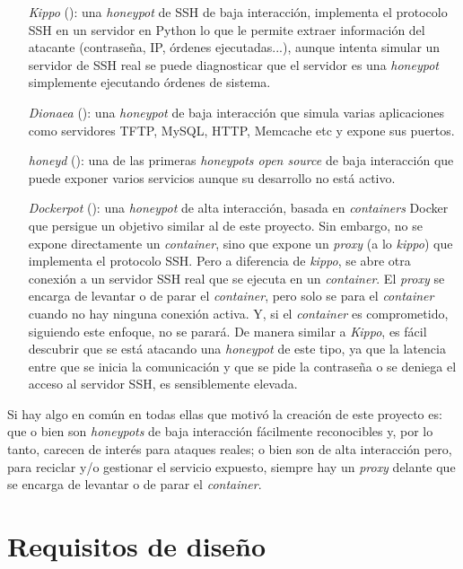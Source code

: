 \begin{enumerate}
    \item[\emph{Kippo}] (\cite{honeynet-kippo}): una \emph{honeypot} de SSH de baja interacción, implementa el protocolo SSH en un servidor en Python
    lo que le permite extraer información del atacante (contraseña, IP, órdenes ejecutadas...), aunque intenta simular un servidor de SSH real
    se puede diagnosticar que el servidor es una \emph{honeypot} simplemente ejecutando órdenes de sistema.
    \item[\emph{Dionaea}] (\cite{honeynet-dionaea}): una \emph{honeypot} de baja interacción que simula varias aplicaciones como servidores TFTP, MySQL, HTTP, Memcache etc y expone sus puertos.
    \item[\emph{honeyd}] (\cite{honeynet-lowinteraction}): una de las primeras \emph{honeypots open source} de baja interacción que puede exponer varios servicios aunque su desarrollo no está activo.
    \item[\emph{Dockerpot}] (\cite{honeynet-dockpot}): una \emph{honeypot} de alta interacción, basada en \emph{containers} Docker que persigue un objetivo similar al de este proyecto.
    Sin embargo, no se expone directamente un \emph{container}, sino que expone un \emph{proxy} (a lo \emph{kippo}) que implementa el protocolo SSH. Pero a diferencia de \emph{kippo}, se abre otra conexión
    a un servidor SSH real que se ejecuta en un \emph{container}. El \emph{proxy} se encarga de levantar o de parar el \emph{container}, pero solo se para el \emph{container} cuando no hay ninguna conexión activa. Y, si el \emph{container} es comprometido, siguiendo este enfoque, no se parará.
    De manera similar a \emph{Kippo}, es fácil descubrir  que se está atacando una \emph{honeypot} de este tipo, ya que la latencia entre que se inicia la comunicación
    y que se pide la contraseña o se deniega el acceso al servidor SSH, es sensiblemente elevada.
\end{enumerate}

Si hay algo en común en todas ellas que motivó la creación de este proyecto es: que o bien son \emph{honeypots} de baja interacción fácilmente reconocibles
y, por lo tanto, carecen de interés para ataques reales; o bien son de alta interacción pero, para reciclar y/o gestionar el servicio expuesto, siempre hay un \emph{proxy} delante
que se encarga de levantar o de parar el \emph{container}.

\section{Requisitos de diseño}
\label{sec:requisitos-de-disenyo}

